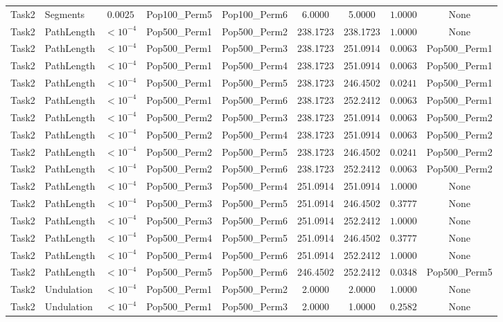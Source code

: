 \documentclass[8pt]{article}
\begin{document}
\begin{longtable}{llccccccc}
Task2 & Segments & $0.0025$ & Pop100\_Perm5 & Pop100\_Perm6 & 6.0000 & 5.0000 & $1.0000$ & None \\
Task2 & PathLength & $< 10^{-4}$ & Pop500\_Perm1 & Pop500\_Perm2 & 238.1723 & 238.1723 & $1.0000$ & None \\
Task2 & PathLength & $< 10^{-4}$ & Pop500\_Perm1 & Pop500\_Perm3 & 238.1723 & 251.0914 & $0.0063$ & Pop500\_Perm1 \\
Task2 & PathLength & $< 10^{-4}$ & Pop500\_Perm1 & Pop500\_Perm4 & 238.1723 & 251.0914 & $0.0063$ & Pop500\_Perm1 \\
Task2 & PathLength & $< 10^{-4}$ & Pop500\_Perm1 & Pop500\_Perm5 & 238.1723 & 246.4502 & $0.0241$ & Pop500\_Perm1 \\
Task2 & PathLength & $< 10^{-4}$ & Pop500\_Perm1 & Pop500\_Perm6 & 238.1723 & 252.2412 & $0.0063$ & Pop500\_Perm1 \\
Task2 & PathLength & $< 10^{-4}$ & Pop500\_Perm2 & Pop500\_Perm3 & 238.1723 & 251.0914 & $0.0063$ & Pop500\_Perm2 \\
Task2 & PathLength & $< 10^{-4}$ & Pop500\_Perm2 & Pop500\_Perm4 & 238.1723 & 251.0914 & $0.0063$ & Pop500\_Perm2 \\
Task2 & PathLength & $< 10^{-4}$ & Pop500\_Perm2 & Pop500\_Perm5 & 238.1723 & 246.4502 & $0.0241$ & Pop500\_Perm2 \\
Task2 & PathLength & $< 10^{-4}$ & Pop500\_Perm2 & Pop500\_Perm6 & 238.1723 & 252.2412 & $0.0063$ & Pop500\_Perm2 \\
Task2 & PathLength & $< 10^{-4}$ & Pop500\_Perm3 & Pop500\_Perm4 & 251.0914 & 251.0914 & $1.0000$ & None \\
Task2 & PathLength & $< 10^{-4}$ & Pop500\_Perm3 & Pop500\_Perm5 & 251.0914 & 246.4502 & $0.3777$ & None \\
Task2 & PathLength & $< 10^{-4}$ & Pop500\_Perm3 & Pop500\_Perm6 & 251.0914 & 252.2412 & $1.0000$ & None \\
Task2 & PathLength & $< 10^{-4}$ & Pop500\_Perm4 & Pop500\_Perm5 & 251.0914 & 246.4502 & $0.3777$ & None \\
Task2 & PathLength & $< 10^{-4}$ & Pop500\_Perm4 & Pop500\_Perm6 & 251.0914 & 252.2412 & $1.0000$ & None \\
Task2 & PathLength & $< 10^{-4}$ & Pop500\_Perm5 & Pop500\_Perm6 & 246.4502 & 252.2412 & $0.0348$ & Pop500\_Perm5 \\
Task2 & Undulation & $< 10^{-4}$ & Pop500\_Perm1 & Pop500\_Perm2 & 2.0000 & 2.0000 & $1.0000$ & None \\
Task2 & Undulation & $< 10^{-4}$ & Pop500\_Perm1 & Pop500\_Perm3 & 2.0000 & 1.0000 & $0.2582$ & None \\

\end{longtable}
\end{document}
